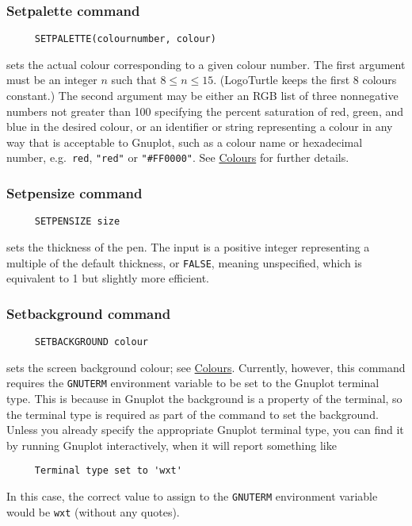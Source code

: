 \subsubsection*{Setpalette command}
\begin{verbatim}
     SETPALETTE(colournumber, colour)
\end{verbatim}
\label{logoturtle:setpalette}
sets the actual colour corresponding to a given colour number.  The
first argument must be an integer $n$ such that $8 \le n \le
15$. (LogoTurtle keeps the first 8 colours constant.)  The second
argument may be either an RGB list of three nonnegative numbers not
greater than 100 specifying the percent saturation of red, green, and
blue in the desired colour, or an identifier or string representing a
colour in any way that is acceptable to Gnuplot, such as a colour name
or hexadecimal number, e.g.\ \texttt{red}, \texttt{"red"} or
\texttt{"\#FF0000"}.  See \hyperref[logoturtle:Colours]{Colours} for
further details.

\subsubsection*{Setpensize command}
\begin{verbatim}
     SETPENSIZE size
\end{verbatim}
sets the thickness of the pen.  The input is a positive integer
representing a multiple of the default thickness, or \texttt{FALSE},
meaning unspecified, which is equivalent to 1 but slightly
more efficient.

\subsubsection*{Setbackground command}
\begin{verbatim}
     SETBACKGROUND colour
\end{verbatim}
sets the screen background colour; see
\hyperref[logoturtle:Colours]{Colours}.  Currently, however, this
command requires the \texttt{GNUTERM} environment variable to be set
to the Gnuplot terminal type.  This is because in Gnuplot the
background is a property of the terminal, so the terminal type is
required as part of the command to set the background.  Unless you
already specify the appropriate Gnuplot terminal type, you can find it
by running Gnuplot interactively, when it will report something like
\begin{verbatim}
     Terminal type set to 'wxt'
\end{verbatim}
In this case, the correct value to assign to the \texttt{GNUTERM}
environment variable would be \texttt{wxt} (without any quotes).



